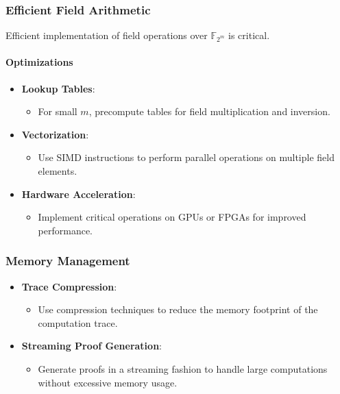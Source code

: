 \documentclass{article}
\theoremstyle{plain}
\theoremstyle{definition}
\theoremstyle{remark}
\theoremstyle{problem}
\begin{document}
\subsubsection{Efficient Field Arithmetic}

Efficient implementation of field operations over $\mathbb{F}_{2^m}$ is critical.

\paragraph{Optimizations}

\begin{itemize}
    \item \textbf{Lookup Tables}:

    \begin{itemize}
        \item For small $m$, precompute tables for field multiplication and inversion.
    \end{itemize}

    \item \textbf{Vectorization}:

    \begin{itemize}
        \item Use SIMD instructions to perform parallel operations on multiple field elements.
    \end{itemize}

    \item \textbf{Hardware Acceleration}:

    \begin{itemize}
        \item Implement critical operations on GPUs or FPGAs for improved performance.
    \end{itemize}
\end{itemize}

\subsubsection{Memory Management}

\begin{itemize}
    \item \textbf{Trace Compression}:

    \begin{itemize}
        \item Use compression techniques to reduce the memory footprint of the computation trace.
    \end{itemize}

    \item \textbf{Streaming Proof Generation}:

    \begin{itemize}
        \item Generate proofs in a streaming fashion to handle large computations without excessive memory usage.
    \end{itemize}
\end{itemize}
\end{document}
